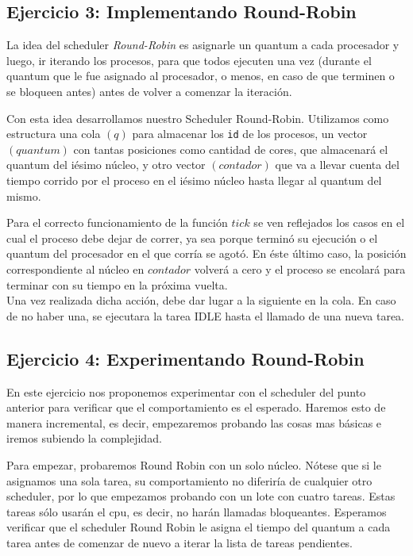 \subsection{Ejercicio 3: Implementando Round-Robin}
La idea del scheduler \textit{Round-Robin} es asignarle un quantum a cada procesador y luego, ir iterando los procesos, 
para que todos ejecuten una vez (durante el quantum que le fue asignado al procesador, o menos, en caso de que terminen
o se bloqueen antes) antes de volver a comenzar la iteraci\'on.

Con esta idea desarrollamos nuestro Scheduler Round-Robin. Utilizamos como estructura una cola $(q)$ para almacenar los \verb|id| de los procesos, 
un vector $(quantum)$ con tantas posiciones como cantidad de cores, que almacenar\'a el quantum del i\'esimo n\'ucleo, 
y otro vector $(contador)$ que va a llevar cuenta del tiempo corrido por el proceso en el i\'esimo n\'ucleo hasta llegar al quantum del mismo.

Para el correcto funcionamiento de la funci\'on $tick$ se ven reflejados los casos en el cual el proceso debe 
dejar de correr, ya sea porque termin\'o su ejecuci\'on o el quantum del procesador en el que corr\'ia se agot\'o. En \'este \'ultimo 
caso, la posici\'on correspondiente al n\'ucleo en $contador$ volver\'a a cero y el proceso se encolar\'a para terminar con su tiempo en la pr\'oxima vuelta. 
\\Una vez realizada dicha acci\'on, debe dar lugar a la siguiente en la cola. En caso de no haber una, se ejecutara la tarea IDLE hasta el llamado de una 
nueva tarea.

\subsection{Ejercicio 4: Experimentando Round-Robin}

En este ejercicio nos proponemos experimentar con el scheduler del punto anterior para verificar que el comportamiento es el esperado. Haremos esto de 
manera incremental, es decir, empezaremos probando las cosas mas b\'asicas e iremos subiendo la complejidad. 

Para empezar, probaremos Round Robin con un solo n\'ucleo. N\'otese que si le asignamos una sola tarea, su comportamiento no diferir\'ia de cualquier otro 
scheduler, por lo que empezamos probando con un lote con cuatro tareas. Estas tareas s\'olo usar\'an el cpu, es decir, no har\'an llamadas bloqueantes.
Esperamos verificar que el scheduler Round Robin le asigna el tiempo del quantum a cada tarea antes de comenzar de nuevo a iterar la lista de tareas
pendientes.

